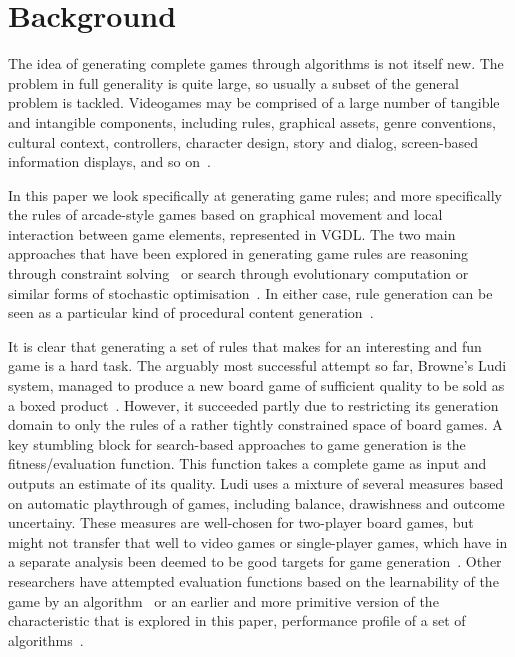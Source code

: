 \documentclass{llncs}
\begin{document}

\section{Background}
The idea of generating complete games through algorithms is not itself new. The problem in full generality is quite large, so usually a subset of the general problem is tackled. Videogames may be comprised of a large number of tangible and intangible components, including rules, graphical assets, genre conventions, cultural context, controllers, character design, story and dialog, screen-based information displays, and so on~\cite{cook2014angelina,liapis2014creativity,nelson2007automated}.

In this paper we look specifically at generating game rules; and more specifically the rules of arcade-style games based on graphical movement and local interaction between game elements, represented in VGDL. The two main approaches that have been explored in generating game rules are reasoning through constraint solving~\cite{smith2010variations} or search through evolutionary computation or similar forms of stochastic optimisation~\cite{togelius2008experiment,browne2008automated,font2013towards}. In either case, rule generation can be seen as a particular kind of procedural content generation~\cite{pcgbook:ch6}.

It is clear that generating a set of rules that makes for an interesting and fun game is a hard task. The arguably most successful attempt so far, Browne's Ludi system, managed to produce a new board game of sufficient quality to be sold as a boxed product~\cite{browne2008automated}. However, it succeeded partly due to restricting its generation domain to only the rules of a rather tightly constrained space of board games. A key stumbling block for search-based approaches to game generation is the fitness/evaluation function. This function takes a complete game as input and outputs an estimate of its quality. Ludi uses a mixture of several measures based on automatic playthrough of games, including balance, drawishness and outcome uncertainy. These measures are well-chosen for two-player board games, but might not transfer that well to video games or single-player games, which have in a separate analysis been deemed to be good targets for game generation~\cite{togelius2014characteristics}. Other researchers have attempted evaluation functions based on the learnability of the game by an algorithm~\cite{togelius2008experiment} or an earlier and more primitive version of the characteristic that is explored in this paper, performance profile of a set of algorithms~\cite{font2013towards}.
\end{document}
